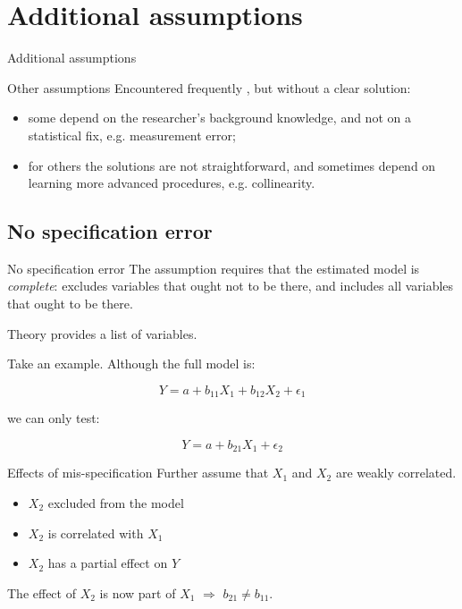\documentclass[12pt,english,pdf,xcolor=dvipsnames,aspectratio=169,handout]{beamer}\usepackage[]{graphicx}\usepackage[]{xcolor}
\begin{document}
\section{Additional assumptions}

\begin{frame}
\begin{center}
    \Huge Additional assumptions
\end{center}
\end{frame}


\begin{frame}{Other assumptions}
Encountered frequently \cite{berry1993}, but without a clear solution:

\begin{itemize}
\item some depend on the researcher's background knowledge, and not on a statistical fix, e.g. measurement error;
\item for others the solutions are not straightforward, and sometimes depend on learning more advanced procedures, e.g. collinearity.
\end{itemize}

\end{frame}


\subsection{No specification error}

\begin{frame}{No specification error}
The assumption requires that the estimated model is \textit{complete}: excludes variables that ought not to be there, and includes all variables that ought to be there.\bigskip

Theory provides a list of variables.\bigskip

Take an example. Although the full model is:

\begin{equation}
Y = a + b_{11}X_1 + b_{12}X_2 + \epsilon_1
\end{equation}

we can only test:

\begin{equation}
Y = a + b_{21}X_1 + \epsilon_2
\end{equation}

\end{frame}



\begin{frame}{Effects of mis-specification}
Further assume that $X_1$ and $X_2$ are weakly correlated.\bigskip

\begin{itemize}
\item $X_2$ excluded from the model
\item $X_2$ is correlated with $X_1$
\item $X_2$ has a partial effect on $Y$
\end{itemize}

The effect of $X_2$ is now part of $X_1$ $\Rightarrow$ $b_{21} \neq b_{11}$.

\end{frame}
\end{document}
